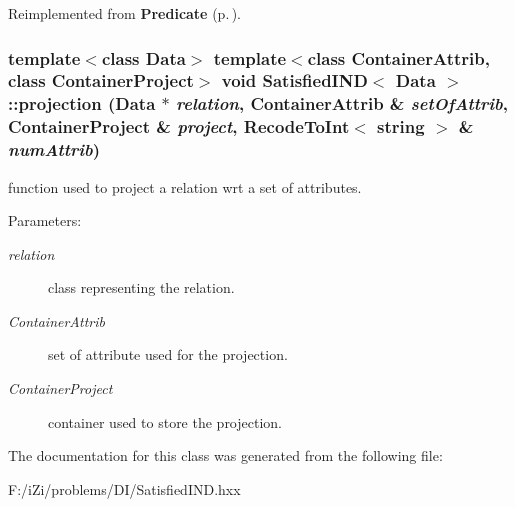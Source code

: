 Reimplemented from {\bf Predicate} {\rm (p.\,\pageref{class_predicate_6fb1a75dba2268f75738f335f403e46c})}.
\subsubsection{\setlength{\rightskip}{0pt plus 5cm}template$<$class Data$>$ template$<$class Container\-Attrib, class Container\-Project$>$ void {\bf Satisfied\-IND}$<$ Data $>$::projection (Data $\ast$ {\em relation}, Container\-Attrib \& {\em set\-Of\-Attrib}, Container\-Project \& {\em project}, {\bf Recode\-To\-Int}$<$ string $>$ \& {\em num\-Attrib})\hspace{0.3cm}{\tt  [protected]}}\label{class_satisfied_i_n_d_bb4eeaeb80e39c8e6dcc804444a1c44e}


function used to project a relation wrt a set of attributes. 

\begin{Desc}
\item[Parameters:]
\begin{description}
\item[{\em relation}]class representing the relation. \item[{\em Container\-Attrib}]set of attribute used for the projection. \item[{\em Container\-Project}]container used to store the projection. \end{description}
\end{Desc}


The documentation for this class was generated from the following file:\begin{CompactItemize}
\item 
F:/i\-Zi/problems/DI/Satisfied\-IND.hxx\end{CompactItemize}
